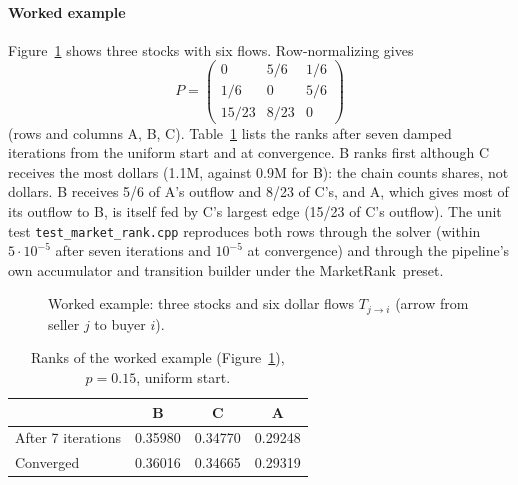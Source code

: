 \documentclass[preprint,3p,twocolumn]{elsarticle}
\newcommand{\MR}{MarketRank}
\begin{document}
\paragraph{Worked example} Figure~\ref{Figure:abc} shows three stocks with six flows. Row-normalizing gives
\[
P=\begin{pmatrix}0 & 5/6 & 1/6\\ 1/6 & 0 & 5/6\\ 15/23 & 8/23 & 0\end{pmatrix}
\]
(rows and columns A, B, C). Table~\ref{Table:abc} lists the ranks after seven damped iterations from the uniform start and at convergence. B ranks first although C receives the most dollars (1.1M, against 0.9M for B): the chain counts shares, not dollars. B receives 5/6 of A's outflow and 8/23 of C's, and A, which gives most of its outflow to B, is itself fed by C's largest edge (15/23 of C's outflow). The unit test \texttt{test\_market\_rank.cpp} reproduces both rows through the solver (within $5\cdot10^{-5}$ after seven iterations and $10^{-5}$ at convergence) and through the pipeline's own accumulator and transition builder under the \MR\ preset.

\begin{figure}[t]
\centering
{}
\caption{Worked example: three stocks and six dollar flows $T_{j\to i}$ (arrow from seller $j$ to buyer $i$).}
\label{Figure:abc}
\end{figure}

\begin{table}[t]
\centering
\caption{Ranks of the worked example (Figure~\ref{Figure:abc}), $p=0.15$, uniform start.}
\label{Table:abc}
\begin{tabular}{lccc}
\toprule
 & B & C & A\\
\midrule
After 7 iterations & 0.35980 & 0.34770 & 0.29248\\
Converged & 0.36016 & 0.34665 & 0.29319\\
\bottomrule
\end{tabular}
\end{table}
\end{document}
